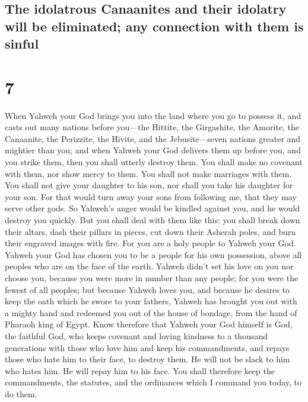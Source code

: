 \hypertarget{the-idolatrous-canaanites-and-their-idolatry-will-be-eliminated-any-connection-with-them-is-sinful}{%
\subsection{The idolatrous Canaanites and their idolatry will be
eliminated; any connection with them is
sinful}\label{the-idolatrous-canaanites-and-their-idolatry-will-be-eliminated-any-connection-with-them-is-sinful}}

\hypertarget{section-6}{%
\section{7}\label{section-6}}

 When Yahweh your God brings you into the land where you
go to possess it, and casts out many nations before you---the Hittite,
the Girgashite, the Amorite, the Canaanite, the Perizzite, the Hivite,
and the Jebusite---seven nations greater and mightier than you;
 and when Yahweh your God delivers them up before you, and
you strike them, then you shall utterly destroy them. You shall make no
covenant with them, nor show mercy to them.  You shall not
make marriages with them. You shall not give your daughter to his son,
nor shall you take his daughter for your son.  For that
would turn away your sons from following me, that they may serve other
gods. So Yahweh's anger would be kindled against you, and he would
destroy you quickly.  But you shall deal with them like
this: you shall break down their altars, dash their pillars in pieces,
cut down their Asherah poles, and burn their engraved images with fire.
 For you are a holy people to Yahweh your God. Yahweh your
God has chosen you to be a people for his own possession, above all
peoples who are on the face of the earth.  Yahweh didn't
set his love on you nor choose you, because you were more in number than
any people; for you were the fewest of all peoples;  but
because Yahweh loves you, and because he desires to keep the oath which
he swore to your fathers, Yahweh has brought you out with a mighty hand
and redeemed you out of the house of bondage, from the hand of Pharaoh
king of Egypt.  Know therefore that Yahweh your God
himself is God, the faithful God, who keeps covenant and loving kindness
to a thousand generations with those who love him and keep his
commandments,  and repays those who hate him to their
face, to destroy them. He will not be slack to him who hates him. He
will repay him to his face.  You shall therefore keep the
commandments, the statutes, and the ordinances which I command you
today, to do them.

